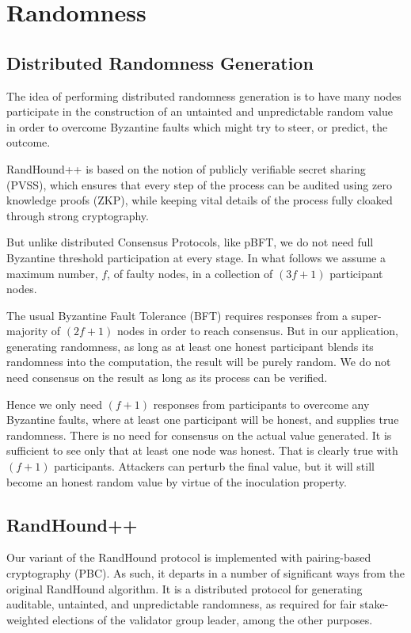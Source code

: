 \documentclass[a4paper, 10pt, conference]{ieeeconf}
\begin{document}
\appendices

\section{Randomness}\label{RandomnessAppendix}

\subsection{Distributed Randomness Generation}
The idea of performing distributed randomness generation is to have many nodes participate in the construction of an untainted and unpredictable random value in order to overcome Byzantine faults which might try to steer, or predict, the outcome.

RandHound++ is based on the notion of publicly verifiable secret sharing (PVSS)\cite{c15}, which ensures that every step of the process can be audited using zero knowledge proofs (ZKP), while keeping vital details of the process fully cloaked through strong cryptography.

But unlike distributed Consensus Protocols, like pBFT, we do not need full Byzantine threshold participation at every stage. In what follows we assume a maximum number, $f$, of faulty nodes, in a collection of $(3 f + 1)$ participant nodes. 

The usual Byzantine Fault Tolerance (BFT) requires responses from a super-majority of $(2 f + 1)$ nodes in order to reach consensus. But in our application, generating randomness, as long as at least one honest participant blends its randomness into the computation, the result will be purely random. We do not need consensus on the result as long as its process can be verified.

Hence we only need $(f + 1)$ responses from participants to overcome any Byzantine faults, where at least one participant will be honest, and supplies true randomness. There is no need for consensus on the actual value generated. It is sufficient to see only that at least one node was honest. That is clearly true with $(f + 1)$ participants. Attackers can perturb the final value, but it will still become an honest random value by virtue of the inoculation property.

\subsection{RandHound++}
Our variant of the RandHound protocol is implemented with pairing-based cryptography (PBC). As such, it departs in a number of significant ways from the original RandHound algorithm. It is a distributed protocol for generating audit\-able, untainted, and unpredictable randomness, as required for fair stake-weighted elections of the validator group leader, among the other purposes.
\end{document}
